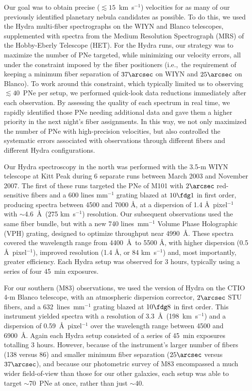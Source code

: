 \documentclass[12pt,preprint]{emulateapj}
\newcommand{\ie}{{i.e.,}}
\newcommand{\kms}{km~s$^{-1}$}
\begin{document}
Our goal was to obtain precise ($\lesssim 15$~\kms) velocities for as many of our previously identified planetary nebula candidates as possible.  To do this, we used the Hydra multi-fiber spectrographs on the WIYN and Blanco telescopes, supplemented with spectra from the Medium Resolution Spectrograph (MRS) of the Hobby-Eberly Telescope (HET).  For the Hydra runs, our strategy was to maximize the number of PNe targeted, while minimizing our velocity errors, all under the constraint imposed by the fiber positioners (\ie\ the requirement of keeping a minimum fiber separation of $37\arcsec$ on WIYN and $25\arcsec$ on Blanco).  To work around this constraint, which typically limited us to observing $\lesssim 40$~PNe per setup, we performed quick-look data reductions immediately after each observation.  By assessing the quality of each spectrum in real time, we rapidly identified those PNe needing additional data and gave them a higher priority in the next night's fiber assignments.  In this way, we not only maximized the number of PNe with high-precision velocities, but also controlled the systematic errors associated with observations through different fibers and different Hydra configurations.

Our Hydra spectroscopy in the north was performed with the 3.5-m WIYN telescope at Kitt Peak during 6 separate runs between March 2003 and November 2007.  The first of these runs targeted the PNe of M101 with $2\arcsec$ red-sensitive fibers and a 600 lines mm$^{-1}$ grating blazed at $10\fdg 1$ in first order, producing spectra between 4500 and 7000 \AA, at a dispersion of 1.4 \AA\ pixel$^{-1}$ with $\sim$4.6~\AA\ (275 \kms) resolution.  Our subsequent observations used the same fiber bundle, but with a new 740 lines~mm$^{-1}$ Volume Phase Holographic (VPH) grating, designed to optimize throughput near 4990~\AA\null.  These spectra covered the wavelength range from 4400~\AA\ to 5500 \AA, with higher dispersion (0.5 \AA\ pixel$^{-1}$), improved resolution (1.4 \AA, or 84 \kms) and, most importantly, greater efficiency.  Each Hydra setup was observed for 3 hours, typically using a series of four 45~min exposures.

For our southern (M83) observations, we used the version of Hydra on the CTIO 4-m Blanco telescope, with an atmospheric dispersion corrector, $2\arcsec$ STU fibers, and a 632~lines~mm$^{-1}$ grating blazed at $10\fdg 8$ in first order.  This instrument yielded spectra with a resolution of 3.3~\AA\ (198~\kms) and a dispersion of 0.59~\AA~pixel$^{-1}$ over the wavelength range between 4500 and 6900~\AA\null.  Again each Hydra setup consisted of a series of 45~min exposures totalling 3 hours.  However, because of the instrument's larger number of fibers (138 versus 86) and smaller minimum fiber separation ($25\arcsec$ versus $37\arcsec$), and because our photometric survey of M83 encompassed a much wider field-of-view than those for our other galaxies, each setup was able to target $\sim$70~PNe at once, rather than just $\sim$40.
\end{document}
